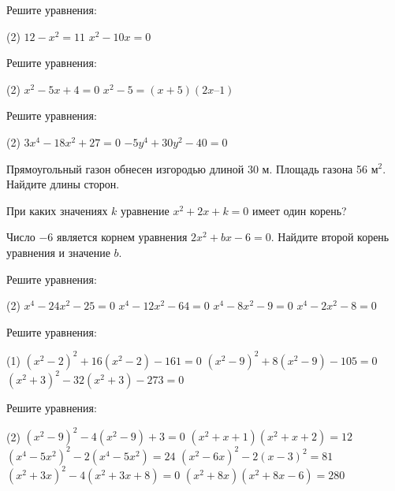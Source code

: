 \begin{homework}[number=1]
	\begin{listofex}
		\item Решите уравнения: 
		\begin{tasks}(2)
			\task \( 12 - x^{2} =11 \)
			\task \( x^{2} - 10x =0 \)
		\end{tasks}
		\item Решите уравнения: 
		\begin{tasks}(2)
			\task \(  x^{2} - 5x+4=0 \)
			\task \(  x^{2} - 5 =(x+5)(2x – 1)\)
		\end{tasks}
		\item Решите уравнения: 
		\begin{tasks}(2)
			\task \(  3x^{4}-18x^{2}+27=0 \)
			\task \(  -5y^{4}+30y^{2}-40=0\)
		\end{tasks}
		\item Прямоугольный газон обнесен изгородью длиной 30 м. Площадь газона 56 м\( ^{2} \). Найдите длины сторон. 
		\item При каких значениях \( k \) уравнение \( x^{2} + 2x + k = 0 \)  имеет один  корень?
		\item Число \( -6 \) является корнем уравнения \( 2x^{2} + bx - 6 = 0 \). Найдите второй корень уравнения и значение \( b \).
	\end{listofex}
\end{homework}

\begin{class}[number=3]
	\begin{listofex}
		\item Решите уравнения:
		\begin{tasks}(2)
			\task \( x^{4}-24x^{2}-25=0 \)
			\task \( x^{4}-12x^{2}-64=0 \)
			\task \( x^{4}-8x^{2}-9=0 \)
			\task \( x^{4}-2x^{2}-8=0 \)
		\end{tasks}
		\item Решите уравнения:
		\begin{tasks}(1)
			\task \( (x^{2}-2)^{2}+16(x^{2}-2)-161=0 \)
			\task \( (x^{2}-9)^{2}+8(x^{2}-9)-105=0 \)
			\task \( (x^{2}+3)^{2}-32(x^{2}+3)-273=0 \)
		\end{tasks}
		\item Решите уравнения: \begin{tasks}(2)
			\task \( (x^{2}-9)^{2}-4(x^{2}-9)+3=0 \)
			\task \( (x^{2}+x+1)(x^{2}+x+2)=12 \)
			\task \( (x^{4}-5x^{2})^{2}-2(x^{4}-5x^{2})=24 \)
			\task \( (x^{2}-6x)^{2}-2(x-3)^{2}=81 \)
			\task \( (x^{2}+3x)^{2}-4(x^{2}+3x+8)=0 \)
			\task \( (x^{2}+8x)(x^{2}+8x-6)=280 \)
		\end{tasks}
		
	\end{listofex}
\end{class}

